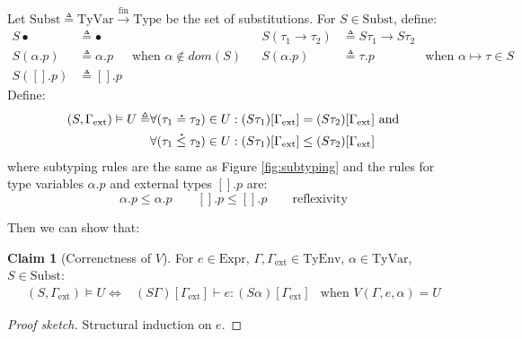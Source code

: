 \documentclass{article}
\theoremstyle{definition}
\newtheorem{clm}{Claim}[section]
\newcommand*{\A}[1]{\overset{\,_{\mbox{\Large .}}}{#1}}
\newcommand*{\Expr}{\text{Expr}}
\newcommand*{\fin}[2]{{#1}\xrightarrow{\text{fin}}{#2}}
\newcommand*{\TyEnv}{\text{TyEnv}}
\newcommand*{\TyVar}{\text{TyVar}}
\newcommand*{\Type}{\text{Type}}
\newcommand*{\Subst}{\text{Subst}}
\newcommand*{\external}{\Gamma_{\text{ext}}}
\begin{document}
Let $\Subst\triangleq\fin{\TyVar}{\Type}$ be the set of substitutions.
For $S\in\Subst$, define:
\begin{align*}
  S\bullet    & \triangleq\bullet  &                                  &  & S(\tau_1\rightarrow\tau_2) & \triangleq S\tau_1\rightarrow S\tau_2                                      \\
  S(\alpha.p) & \triangleq\alpha.p & \text{when }\alpha\not\in dom(S) &  & S(\alpha.p)                & \triangleq \tau.p                     & \text{when }\alpha\mapsto\tau\in S \\
  S([].p)     & \triangleq [].p
\end{align*}
Define:
\begin{align*}
  (S,\external)\vDash U\triangleq & \forall(\tau_1\A{=}\tau_2)\in U:(S\tau_1)[\external]= (S\tau_2)[\external]\text{ and} \\
                                  & \forall(\tau_1\A{\le}\tau_2)\in U:(S\tau_1)[\external]\le(S\tau_2)[\external]
\end{align*}
where subtyping rules are the same as Figure \ref{fig:subtyping} and the rules for type variables $\alpha.p$ and external types $[].p$ are:
\[\alpha.p\le\alpha.p\qquad[].p\le[].p\qquad\text{reflexivity}\]

Then we can show that:
\begin{clm}[Correnctness of $V$]
  For $e\in\Expr$, $\Gamma,\external\in\TyEnv$, $\alpha\in\TyVar$, $S\in\Subst$:
  \begin{align*}
    (S,\external)\vDash U \Leftrightarrow & (S\Gamma)[\external]\vdash e:(S\alpha)[\external] & \text{when }V(\Gamma,e,\alpha)=U
  \end{align*}
\end{clm}
\begin{proof}[Proof sketch]
  Structural induction on $e$.
\end{proof}
\end{document}
